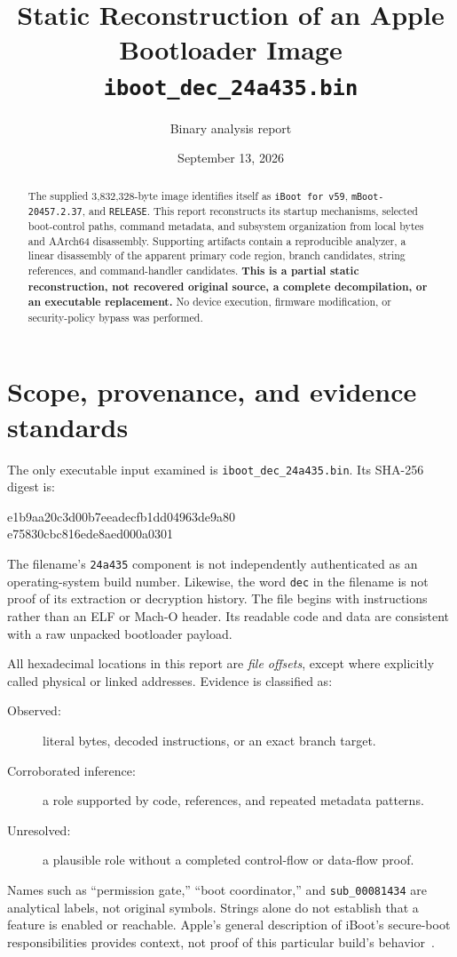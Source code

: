 \documentclass[11pt]{article}
\title{Static Reconstruction of an Apple Bootloader Image\\
\large \texttt{iboot\_dec\_24a435.bin}}
\author{Binary analysis report}
\date{September 13, 2026}
\begin{document}
\maketitle

\begin{abstract}
The supplied 3,832,328-byte image identifies itself as
\texttt{iBoot for v59}, \texttt{mBoot-20457.2.37}, and \texttt{RELEASE}.
This report reconstructs its startup mechanisms, selected boot-control
paths, command metadata, and subsystem organization from local bytes and
AArch64 disassembly. Supporting artifacts contain a reproducible analyzer,
a linear disassembly of the apparent primary code region, branch candidates,
string references, and command-handler candidates.
\textbf{This is a partial static reconstruction, not recovered original source,
a complete decompilation, or an executable replacement.} No device execution,
firmware modification, or security-policy bypass was performed.
\end{abstract}
\tableofcontents
\newpage

\section{Scope, provenance, and evidence standards}
The only executable input examined is \texttt{iboot\_dec\_24a435.bin}.
Its SHA-256 digest is:
\begin{center}\small\ttfamily
 e1b9aa20c3d00b7eeadecfb1dd04963de9a80\\
 e75830cbc816ede8aed000a0301
\end{center}
The filename's \texttt{24a435} component is not independently authenticated
as an operating-system build number. Likewise, the word \texttt{dec} in the
filename is not proof of its extraction or decryption history. The file
begins with instructions rather than an ELF or Mach-O header. Its readable
code and data are consistent with a raw unpacked bootloader payload.

All hexadecimal locations in this report are \emph{file offsets}, except
where explicitly called physical or linked addresses. Evidence is classified as:
\begin{description}
\item[Observed:] literal bytes, decoded instructions, or an exact branch target.
\item[Corroborated inference:] a role supported by code, references, and repeated metadata patterns.
\item[Unresolved:] a plausible role without a completed control-flow or data-flow proof.
\end{description}
Names such as ``permission gate,'' ``boot coordinator,'' and
\texttt{sub\_00081434} are analytical labels, not original symbols.
Strings alone do not establish that a feature is enabled or reachable.
Apple's general description of iBoot's secure-boot responsibilities provides
context, not proof of this particular build's behavior~\cite{apple}.
\end{document}
